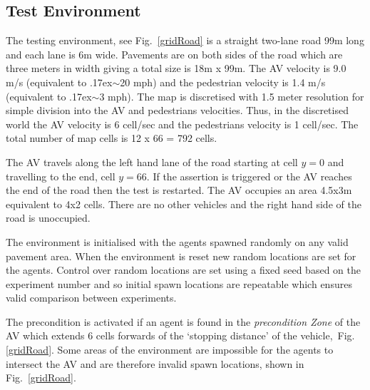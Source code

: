 \documentclass[letterpaper, 10 pt, journal, twoside]{IEEEtran}
\begin{document}
\subsection{Test Environment}
The testing environment, see Fig.~\ref{gridRoad} is a straight two-lane road 99m long and each lane is 6m wide. Pavements are on both sides of the road which are three meters in width giving a total size is 18m x 99m. 
%
The AV velocity is 9.0 m/s (equivalent to {\raise.17ex\hbox{$\scriptstyle\sim$}}20 mph) and the pedestrian velocity is 1.4 m/s (equivalent to {\raise.17ex\hbox{$\scriptstyle\sim$}}3 mph). The map is discretised with 1.5 meter resolution for simple division into the AV and pedestrians velocities. Thus, in the discretised world the AV velocity is 6 cell/sec and the pedestrians velocity is 1 cell/sec. The total number of map cells is 12 x 66 = 792 cells. 

The AV travels along the left hand lane of the road starting at cell $y=0$ and travelling to the end, cell $y=66$. If the assertion is triggered or the AV reaches the end of the road then the test is restarted. The AV occupies an area 4.5x3m equivalent to 4x2 cells. There are no other vehicles and the right hand side of the road is unoccupied.

The environment is initialised with the agents spawned randomly on any valid pavement area. When the environment is reset new random locations are set for the agents. Control over random locations are set using a fixed seed based on the experiment number and so initial spawn locations are repeatable %
which ensures valid comparison between experiments.

The precondition is activated if an agent is found in the \textit{precondition Zone} of the AV which extends 6 cells forwards of the `stopping distance' of the vehicle,~Fig.\ref{gridRoad}. %
%
Some areas of the environment are impossible for the agents to intersect the AV and are therefore invalid spawn locations, shown in Fig.~\ref{gridRoad}. %
\end{document}
